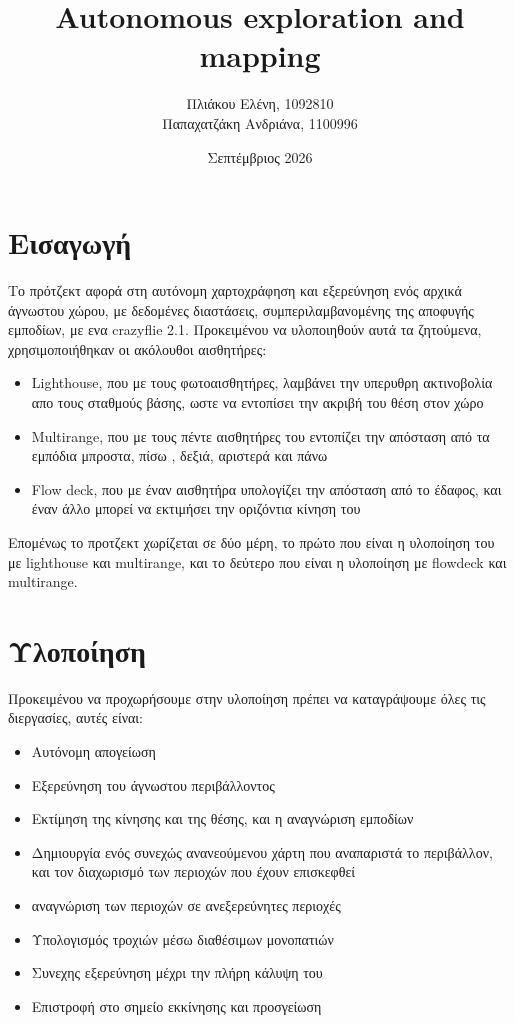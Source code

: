 \documentclass{article}
\title{Autonomous exploration and mapping}
\author{Πλιάκου Ελένη, 1092810 
    \\ Παπαχατζάκη Ανδριάνα, 1100996 }
\date{Σεπτέμβριος 2026}
\begin{document}
\maketitle

\section{Εισαγωγή}
Το πρότζεκτ αφορά στη αυτόνομη χαρτοχράφηση και εξερεύνηση ενός αρχικά άγνωστου χώρου, με δεδομένες διαστάσεις, συμπεριλαμβανομένης της αποφυγής εμποδίων, με ενα crazyflie 2.1. Προκειμένου να υλοποιηθούν αυτά τα ζητούμενα, χρησιμοποιήθηκαν οι ακόλουθοι αισθητήρες:
\begin{itemize}
    \item Lighthouse, που με τους φωτοαισθητήρες, λαμβάνει την υπερυθρη ακτινοβολία απο τους σταθμούς βάσης, ωστε να εντοπίσει την ακριβή του θέση στον χώρο
    \item Multirange, που με τους πέντε αισθητήρες του εντοπίζει την απόσταση από τα εμπόδια μπροστα, πίσω , δεξιά, αριστερά και πάνω%
    \item Flow deck, που με έναν αισθητήρα υπολογίζει την απόσταση από το έδαφος, και έναν άλλο μπορεί να εκτιμήσει την οριζόντια κίνηση του 
\end{itemize}
Επομένως το προτζεκτ χωρίζεται σε δύο μέρη, το πρώτο που είναι η υλοποίηση του με lighthouse και multirange, και το δεύτερο που είναι η υλοποίηση με flowdeck και multirange.
\section{Υλοποίηση}
Προκειμένου να προχωρήσουμε στην υλοποίηση πρέπει να καταγράψουμε όλες τις διεργασίες, αυτές είναι:
\begin{itemize}
    \item Αυτόνομη απογείωση
    \item Εξερεύνηση του άγνωστου περιβάλλοντος
    \item Εκτίμηση της κίνησης και της θέσης, και η αναγνώριση εμποδίων 
    \item Δημιουργία ενός συνεχώς ανανεούμενου χάρτη που αναπαριστά το περιβάλλον, και τον διαχωρισμό των περιοχών που έχουν επισκεφθεί
    \item αναγνώριση των περιοχών σε ανεξερεύνητες περιοχές
    \item Υπολογισμός τροχιών μέσω διαθέσιμων μονοπατιών
    \item Συνεχης εξερεύνηση μέχρι την πλήρη κάλυψη του
    \item Επιστροφή στο σημείο εκκίνησης και προσγείωση
\end{itemize}
\end{document}
